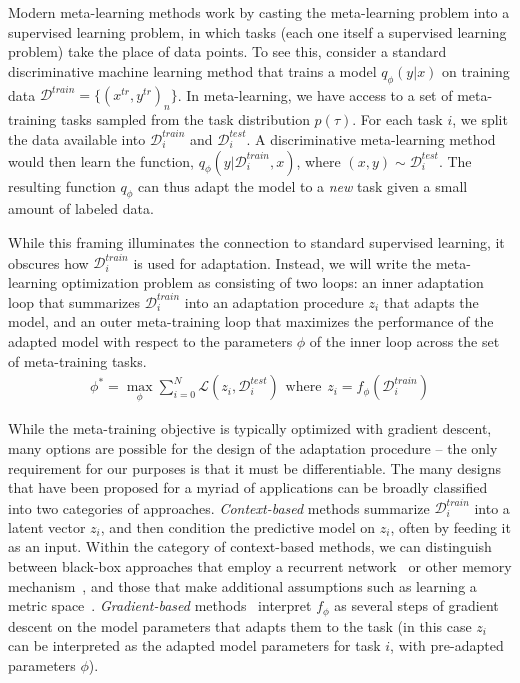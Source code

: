Modern meta-learning methods work by casting the meta-learning problem into a supervised learning problem, in which tasks (each one itself a supervised learning problem) take the place of data points.
To see this, consider a standard discriminative machine learning method that trains a model $q_{\phi}(y|x)$ on training data $\mathcal{D}^{train} = \{(x^{tr}, y^{tr})_n\}$.
In meta-learning, we have access to a set of meta-training tasks sampled from the task distribution $p(\tau)$. 
For each task $i$, we split the data available into $\mathcal{D}_i^{train}$ and $\mathcal{D}_i^{test}$.
A discriminative meta-learning method would then learn the function, $q_{\phi}(y| \mathcal{D}_i^{train}, x)$, where $(x, y) \sim \mathcal{D}_i^{test}$.
The resulting function $q_{\phi}$ can thus adapt the model to a \emph{new} task given a small amount of labeled data.

While this framing illuminates the connection to standard supervised learning, it obscures how $\mathcal{D}_i^{train}$ is used for adaptation.
Instead, we will write the meta-learning optimization problem as consisting of two loops: an inner adaptation loop that summarizes $\mathcal{D}_i^{train}$ into an adaptation procedure $z_i$ that adapts the model, and an outer meta-training loop that maximizes the performance of the adapted model with respect to the parameters $\phi$ of the inner loop across the set of meta-training tasks.
\begin{align}
\phi^* = \max_{\phi} \sum_{i=0}^N \mathcal{L}(z_i, \mathcal{D}_i^{test}) 
 \hspace{5pt} \text{where} \hspace{5pt} z_i = f_{\phi}(\mathcal{D}_i^{train})
\label{meta-learning-eq}
\end{align}

While the meta-training objective is typically optimized with gradient descent, many options are possible for the design of the adaptation procedure -- the only requirement for our purposes is that it must be differentiable.
The many designs that have been proposed for a myriad of applications can be broadly classified into two categories of approaches. 
\emph{Context-based} methods summarize $\mathcal{D}_i^{train}$ into a latent vector $z_i$, and then condition the predictive model on $z_i$, often by feeding it as an input. 
Within the category of context-based methods, we can distinguish between black-box approaches that employ a recurrent network~\citep{ravi2017optimization} or other memory mechanism~\citep{santoro2016meta}, and those that make additional assumptions such as learning a metric space~\citep{vinyals2016matching, snell2017prototypical, sung2018learning}. 
\emph{Gradient-based} methods~\citep{finn2017model} interpret $f_{\phi}$ as several steps of gradient descent on the model parameters that adapts them to the task (in this case $z_i$ can be interpreted as the adapted model parameters for task $i$, with pre-adapted parameters $\phi$).

